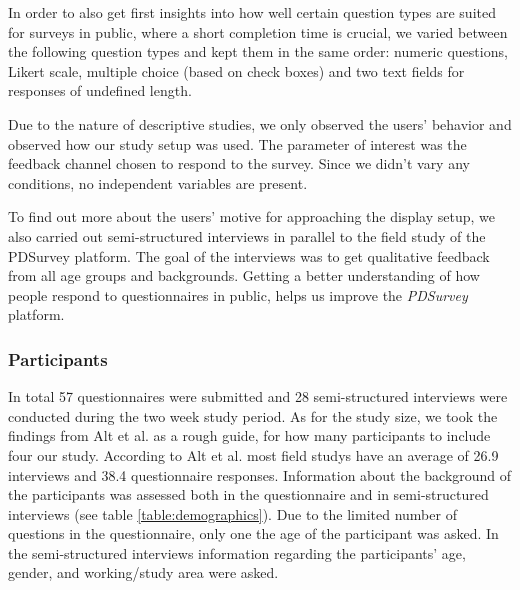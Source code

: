 
	In order to also get first insights into how well certain question types are suited for surveys in public, where a short completion time is crucial, we varied between the following question types and kept them in the same order: numeric questions, Likert scale, multiple choice (based on check boxes) and two text fields for responses of undefined length. 

	Due to the nature of descriptive studies, we only observed the users' behavior and observed how our study setup was used. The parameter of interest was the feedback channel chosen to respond to the survey. Since we didn't vary any conditions, no independent variables are present.


	To find out more about the users' motive for approaching the display setup, we also carried out semi-structured interviews in parallel to the field study of the PDSurvey platform. The goal of the interviews was to get qualitative feedback from all age groups and backgrounds. Getting a better understanding of how people respond to questionnaires in public, helps us improve the \textit{PDSurvey} platform.




	\subsubsection{Participants} %
	\label{chapter:field-study:participants}

		In total 57 questionnaires were submitted and 28 semi-structured interviews were conducted during the two week study period. As for the study size, we took the findings from Alt et al.\cite{Alt2012HowToEvaluate} as a rough guide, for how many participants to include four our study. According to Alt et al. most field studys have an average of 26.9 interviews and 38.4 questionnaire responses.
		Information about the background of the participants was assessed both in the questionnaire and in semi-structured interviews (see table \ref{table:demographics}). Due to the limited number of questions in the questionnaire, only one the age of the participant was asked. In the semi-structured interviews information regarding the participants' age, gender, and working/study area were asked.

